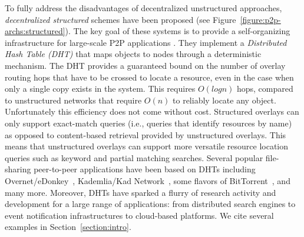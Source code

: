 To fully address the disadvantages of decentralized unstructured approaches,
\emph{decentralized structured} schemes have been proposed (see
Figure~\ref{figure:p2p-archs:structured}). The key goal of these systems is to
provide a self-organizing infrastructure for large-scale P2P applications
\cite{ratnasamy_can_2001,stoica_chord_2001,antony_pastry_2001,zhao_tapestry_2001,maymounkov_kademlia_2002,rgrk_bamboo_2004}.
They implement a \emph{Distributed Hash Table (DHT)} that maps objects to nodes
through a deterministic mechanism. The DHT provides a guaranteed bound on the
number of overlay routing hops that have to be crossed to locate a resource, even
in the case when only a single copy exists in the system.  This requires
$O \left( log n \right)$ hops, compared to unstructured networks that require
$O \left( n \right)$ to reliably locate any object. Unfortunately this
efficiency does not come without cost. Structured overlays can only support
exact-match queries (i.e., queries that identify resources by name) as opposed
to content-based retrieval provided by unstructured overlays. This means
that unstructured overlays can support more versatile resource location queries
such as keyword and partial matching searches. Several popular file-sharing
peer-to-peer applications have been based on DHTs including
Overnet/eDonkey~\cite{overnet}, Kademlia/Kad
Network~\cite{maymounkov_kademlia_2002}, some flavors of
BitTorrent~\cite{c_bittorrent_2003}, and many more.  Moreover, DHTs have sparked
a flurry of research activity and development for a large range of applications:
from distributed search engines to event notification infrastructures to
cloud-based platforms. We cite several examples in Section~\ref{section:intro}.


